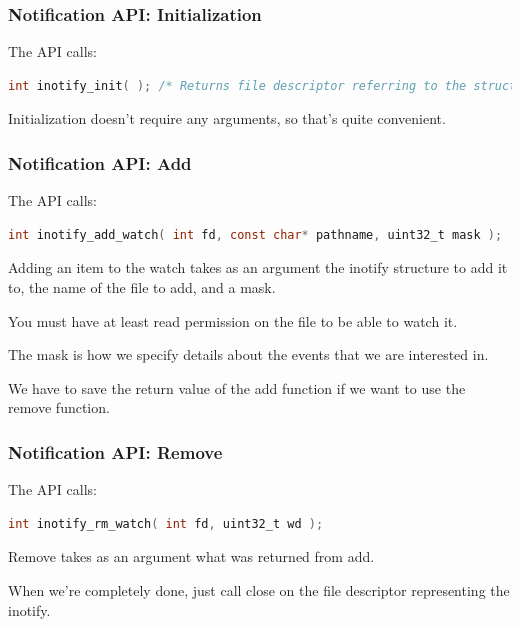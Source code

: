 \begin{frame}[fragile]
	\frametitle{Notification API: Initialization}

	The API calls:
	\begin{lstlisting}[language=C]
int inotify_init( ); /* Returns file descriptor referring to the struct */
\end{lstlisting}

	Initialization doesn't require any arguments, so that's quite convenient.

\end{frame}

\begin{frame}[fragile]
	\frametitle{Notification API: Add}

	The API calls:
	\begin{lstlisting}[language=C]
int inotify_add_watch( int fd, const char* pathname, uint32_t mask );
\end{lstlisting}


	Adding an item to the watch takes as an argument the inotify structure to add it to, the name of the file to add, and a mask.

	You must have at least read permission on the file to be able to watch it.

	The mask is how we specify details about the events that we are interested in.

	We have to save the return value of the add function if we want to use the remove function.

\end{frame}

\begin{frame}[fragile]
	\frametitle{Notification API: Remove}

	The API calls:
	\begin{lstlisting}[language=C]
int inotify_rm_watch( int fd, uint32_t wd );
\end{lstlisting}

	Remove takes as an argument what was returned from add.

	When we're completely done, just call close on the file descriptor representing the inotify.

\end{frame}


